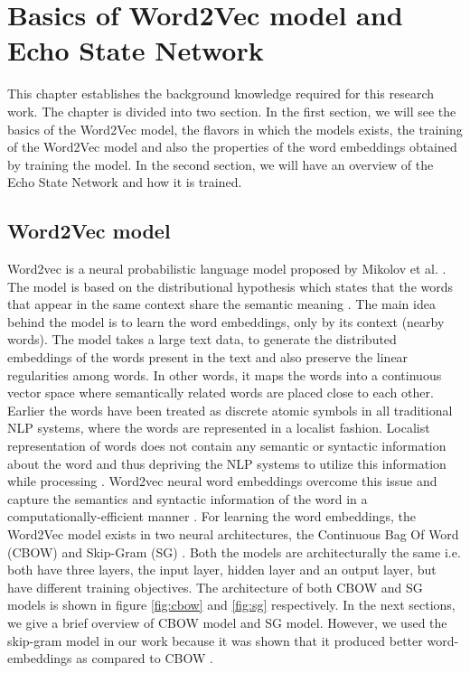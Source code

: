 \chapter{Basics of Word2Vec model and Echo State Network}\label{basics}

This chapter establishes the background knowledge required for this research work. The chapter is divided into two section. In the first section, we will see the basics of the Word2Vec model, the flavors in which the models exists, the training of the Word2Vec model and also the properties of the word embeddings obtained by training the model. In the second section, we will have an overview of the Echo State Network and how it is trained. 

\section{Word2Vec model}

Word2vec is a neural probabilistic language model proposed by Mikolov et al. \cite{w2v:mikolov_2013_distributed}. The model is based on the distributional hypothesis which states that the words that appear in the same context share the semantic meaning \cite{w2v:tensor_flow}. The main idea behind the model is to learn the word embeddings, only by its context (nearby words). The model takes a large text data, to generate the distributed embeddings of the words present in the text and also preserve the linear regularities among words. In other words, it maps the words into a continuous vector space where semantically related words are placed close to each other. Earlier the words have been treated as discrete atomic symbols in all traditional NLP systems, where the words are represented in a localist fashion. Localist representation of words does not contain any semantic or syntactic information about the word and thus depriving the NLP systems to utilize this information while processing \cite{w2v:baroni:2014}. Word2vec neural word embeddings overcome this issue and capture the semantics and syntactic information of the word in a computationally-efficient manner \cite{w2v:mikolov_2013_efficient}. For learning the word embeddings, the Word2Vec model exists in two neural architectures, the Continuous Bag Of Word (CBOW) and Skip-Gram (SG) \cite{w2v:mikolov_2013_efficient, w2v:mikolov_2013_distributed}. Both the models are architecturally the same i.e. both have three layers, the input layer, hidden layer and an output layer, but have different training objectives. The architecture of both CBOW and SG models is shown in figure \ref{fig:cbow} and \ref{fig:sg} respectively. In the next sections, we give a brief overview of CBOW model and SG model. However, we used the skip-gram model in our work because it was shown that it produced better word-embeddings as compared to CBOW \cite{w2v:mikolov_2013_distributed}.


